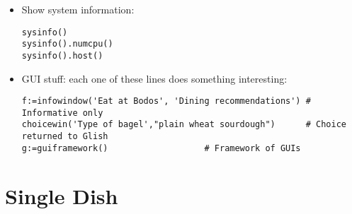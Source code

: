 \begin{itemize}
\item Show system information:
\begin{verbatim}
sysinfo()
sysinfo().numcpu()
sysinfo().host()
\end{verbatim}
\item GUI stuff: each one of these lines does something interesting:
\begin{verbatim}
f:=infowindow('Eat at Bodos', 'Dining recommendations') # Informative only
choicewin('Type of bagel',"plain wheat sourdough")      # Choice returned to Glish
g:=guiframework()					# Framework of GUIs
\end{verbatim}
\end{itemize}

\section{Single Dish}

